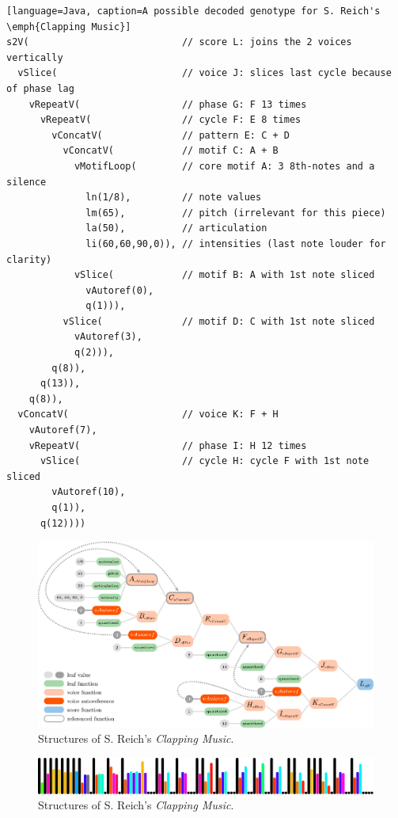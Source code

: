 \documentclass{article}
\begin{document}
\begin{lstlisting}[float][language=Java, caption=A possible decoded genotype for S. Reich's \emph{Clapping Music}]
s2V(                           // score L: joins the 2 voices vertically
  vSlice(                      // voice J: slices last cycle because of phase lag
    vRepeatV(                  // phase G: F 13 times
      vRepeatV(                // cycle F: E 8 times 
        vConcatV(              // pattern E: C + D
          vConcatV(            // motif C: A + B
            vMotifLoop(        // core motif A: 3 8th-notes and a silence
              ln(1/8),         // note values
              lm(65),          // pitch (irrelevant for this piece)
              la(50),          // articulation
              li(60,60,90,0)), // intensities (last note louder for clarity) 
            vSlice(            // motif B: A with 1st note sliced
              vAutoref(0),
              q(1))),
          vSlice(              // motif D: C with 1st note sliced
            vAutoref(3),
            q(2))),
        q(8)),
      q(13)),
    q(8)),
  vConcatV(                    // voice K: F + H
    vAutoref(7),
    vRepeatV(                  // phase I: H 12 times 
      vSlice(                  // cycle H: cycle F with 1st note sliced
        vAutoref(10),
        q(1)),
      q(12))))
\end{lstlisting}

\begin{figure}
  \includegraphics[width=\linewidth]{figs/clapping_tree_graph_colours_code.pdf}
  \caption{Structures of S. Reich's \emph{Clapping Music}.}
  \label{fig:boat2}
\end{figure}



\begin{figure}
\begin{center}
  \includegraphics[width=13cm]{figs/clappingVisualized.pdf}
\end{center}  
  \caption{Structures of S. Reich's \emph{Clapping Music}.}
  \label{fig:boat3}
\end{figure}
\end{document}
